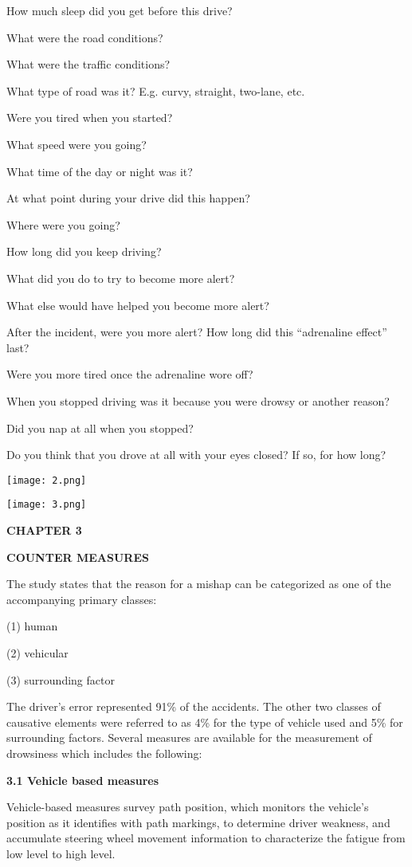 \documentclass[a4paper,12pt]{article}
\begin{document}
How much sleep did you get before this drive?

What were the road conditions?

What were the traffic conditions?

What type of road was it? E.g. curvy, straight, two-lane, etc.

Were you tired when you started?

What speed were you going?

What time of the day or night was it?

At what point during your drive did this happen?

Where were you going?

How long did you keep driving?

What did you do to try to become more alert?

What else would have helped you become more alert?

After the incident, were you more alert? How long did this ``adrenaline
effect'' last?

Were you more tired once the adrenaline wore off?

When you stopped driving was it because you were drowsy or another
reason?

Did you nap at all when you stopped?

Do you think that you drove at all with your eyes closed? If so, for how
long?

\texttt{[image: 2.png]}

\texttt{[image: 3.png]}

\textbf{CHAPTER 3}

\textbf{COUNTER MEASURES}

The study states that the reason for a mishap can be categorized as one
of the accompanying primary classes:

(1) human

(2) vehicular

(3) surrounding factor

The driver's error represented 91\% of the accidents. The other two
classes of causative elements were referred to as 4\% for the type of
vehicle used and 5\% for surrounding factors. Several measures are
available for the measurement of drowsiness which includes the
following:

\textbf{3.1 Vehicle based measures}

Vehicle-based measures survey path position, which monitors the
vehicle's position as it identifies with path markings, to determine
driver weakness, and accumulate steering wheel movement information to
characterize the fatigue from low level to high level.
\end{document}
